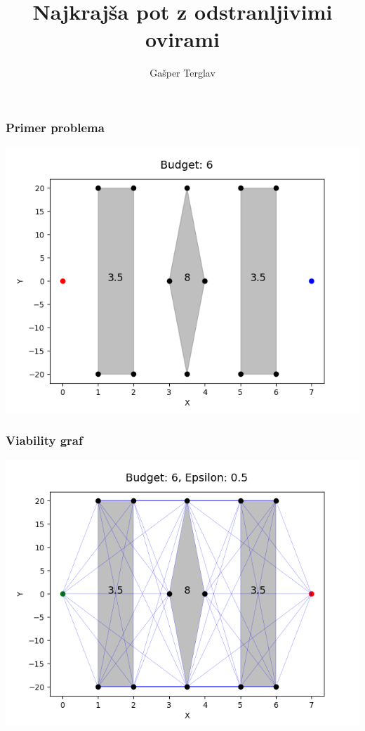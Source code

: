 \documentclass{beamer}
\title{Najkrajša pot z odstranljivimi ovirami}
\author{ Gašper Terglav}
\institute[FMF] %
\begin{document}
\begin{frame}
    \titlepage
\end{frame}


\begin{frame}
    \frametitle{Primer problema}

    \includegraphics[width=1\textwidth]{err1.png}

\end{frame}

\begin{frame}
    \frametitle{Viability graf}

    \includegraphics[width=1\textwidth]{errGraph1.png}

\end{frame}
\end{document}
